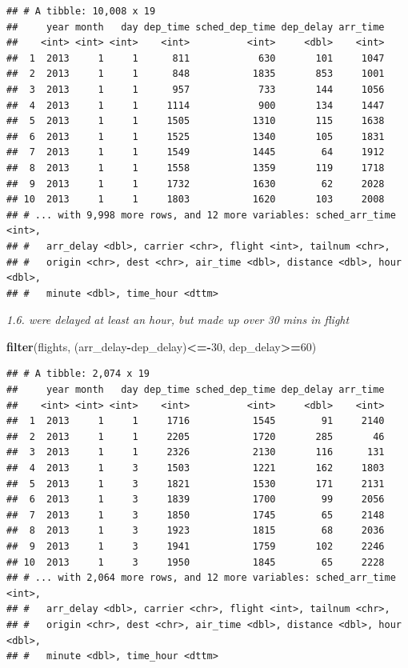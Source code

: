 \documentclass[]{book}
\newenvironment{Shaded}{\begin{snugshade}}{\end{snugshade}}
\newcommand{\DecValTok}[1]{\textcolor[rgb]{0.00,0.00,0.81}{#1}}
\newcommand{\KeywordTok}[1]{\textcolor[rgb]{0.13,0.29,0.53}{\textbf{#1}}}
\newcommand{\NormalTok}[1]{#1}
\newcommand{\OperatorTok}[1]{\textcolor[rgb]{0.81,0.36,0.00}{\textbf{#1}}}
\theoremstyle{definition}
\theoremstyle{definition}
\theoremstyle{definition}
\theoremstyle{remark}
\begin{document}
\begin{verbatim}
## # A tibble: 10,008 x 19
##     year month   day dep_time sched_dep_time dep_delay arr_time
##    <int> <int> <int>    <int>          <int>     <dbl>    <int>
##  1  2013     1     1      811            630       101     1047
##  2  2013     1     1      848           1835       853     1001
##  3  2013     1     1      957            733       144     1056
##  4  2013     1     1     1114            900       134     1447
##  5  2013     1     1     1505           1310       115     1638
##  6  2013     1     1     1525           1340       105     1831
##  7  2013     1     1     1549           1445        64     1912
##  8  2013     1     1     1558           1359       119     1718
##  9  2013     1     1     1732           1630        62     2028
## 10  2013     1     1     1803           1620       103     2008
## # ... with 9,998 more rows, and 12 more variables: sched_arr_time <int>,
## #   arr_delay <dbl>, carrier <chr>, flight <int>, tailnum <chr>,
## #   origin <chr>, dest <chr>, air_time <dbl>, distance <dbl>, hour <dbl>,
## #   minute <dbl>, time_hour <dttm>
\end{verbatim}

\emph{1.6. were delayed at least an hour, but made up over 30 mins in
flight}

\begin{Shaded}
\begin{Highlighting}[]
\KeywordTok{filter}\NormalTok{(flights, (arr_delay}\OperatorTok{-}\NormalTok{dep_delay)}\OperatorTok{<=-}\DecValTok{30}\NormalTok{, dep_delay}\OperatorTok{>=}\DecValTok{60}\NormalTok{)}
\end{Highlighting}
\end{Shaded}

\begin{verbatim}
## # A tibble: 2,074 x 19
##     year month   day dep_time sched_dep_time dep_delay arr_time
##    <int> <int> <int>    <int>          <int>     <dbl>    <int>
##  1  2013     1     1     1716           1545        91     2140
##  2  2013     1     1     2205           1720       285       46
##  3  2013     1     1     2326           2130       116      131
##  4  2013     1     3     1503           1221       162     1803
##  5  2013     1     3     1821           1530       171     2131
##  6  2013     1     3     1839           1700        99     2056
##  7  2013     1     3     1850           1745        65     2148
##  8  2013     1     3     1923           1815        68     2036
##  9  2013     1     3     1941           1759       102     2246
## 10  2013     1     3     1950           1845        65     2228
## # ... with 2,064 more rows, and 12 more variables: sched_arr_time <int>,
## #   arr_delay <dbl>, carrier <chr>, flight <int>, tailnum <chr>,
## #   origin <chr>, dest <chr>, air_time <dbl>, distance <dbl>, hour <dbl>,
## #   minute <dbl>, time_hour <dttm>
\end{verbatim}
\end{document}
